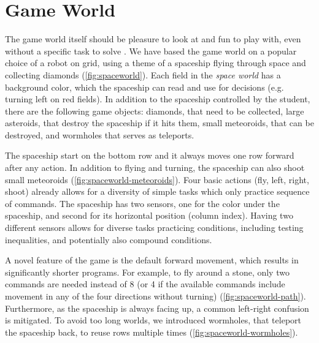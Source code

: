 

\section{Game World}  %
\label{sec:robomission.game-world}

The game world itself should be pleasure to look at and fun to play with,
even without a specific task to solve \cite{book-of-lenses}.
We have based the game world on a popular choice of a robot on grid,
using a theme of a spaceship flying through space and collecting diamonds
(\cref{fig:spaceworld}).
Each field in the \emph{space world} has a background color, which
the spaceship can read and use for decisions (e.g. turning left on red fields).
In addition to the spaceship controlled by the student,
there are the following game objects:
diamonds, that need to be collected,
large asteroids, that destroy the spaceship if it hits them,
small meteoroids, that can be destroyed,
and wormholes that serves as teleports.

The spaceship start on the bottom row and it always moves one row forward
after any action. %
In addition to flying and turning, the spaceship can also shoot small meteoroids
(\cref{fig:spaceworld-meteoroids}).
Four basic actions (fly, left, right, shoot) already allows for a
diversity of simple tasks which only practice sequence of commands.
The spaceship has two sensors, one for the color under the spaceship, and
second for its horizontal position (column index). Having two different sensors allows
for diverse tasks practicing conditions, including testing inequalities, and
potentially also compound conditions.

A novel feature of the game is the default forward movement,
which results in significantly shorter programs.
For example, to fly around a stone, only two commands are needed %
instead of 8 (or 4 if the available commands include
movement in any of the four directions without turning)
(\cref{fig:spaceworld-path}).
Furthermore, as the spaceship is always facing up, a common left-right
confusion \cite{blockly-10-things} is mitigated.
To avoid too long worlds, we introduced wormholes, that teleport the
spaceship back, to reuse rows multiple times
(\cref{fig:spaceworld-wormholes}).


